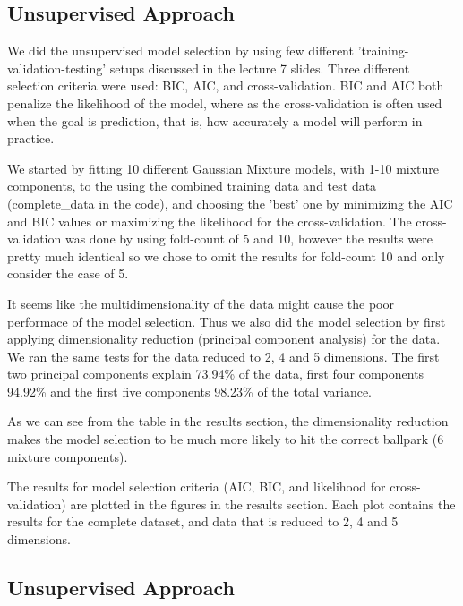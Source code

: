 \subsection{Unsupervised Approach}
We did the unsupervised model selection by using few different 'training-validation-testing' setups discussed in the lecture 7 slides. Three different selection criteria were used: BIC, AIC, and cross-validation. BIC and AIC both penalize the likelihood of the model, where as the cross-validation is often used when the goal is prediction, that is, how accurately a model will perform in practice.

We started by fitting 10 different Gaussian Mixture models, with 1-10 mixture components, to the using the combined training data and test data (complete\_data in the code), and choosing the 'best' one by minimizing the AIC and BIC values or maximizing the likelihood for the cross-validation. The cross-validation was done by using fold-count of 5 and 10, however the results were pretty much identical so we chose to omit the results for fold-count 10 and only consider the case of 5.

It seems like the multidimensionality of the data might cause the poor performace of the model selection. Thus we also did the model selection by first applying dimensionality reduction (principal component analysis) for the data. We ran the same tests for the data reduced to 2, 4 and 5 dimensions. The first two principal components explain 73.94\% of the data, first four components 94.92\% and the first five components 98.23\% of the total variance.

As we can see from the table in the results section, the dimensionality reduction makes the model selection to be much more likely to hit the correct ballpark (6 mixture components).

The results for model selection criteria (AIC, BIC, and likelihood for cross-validation) are plotted in the figures in the results section. Each plot contains the results for the complete dataset, and data that is reduced to 2, 4 and 5 dimensions.

\subsection{Unsupervised Approach}


